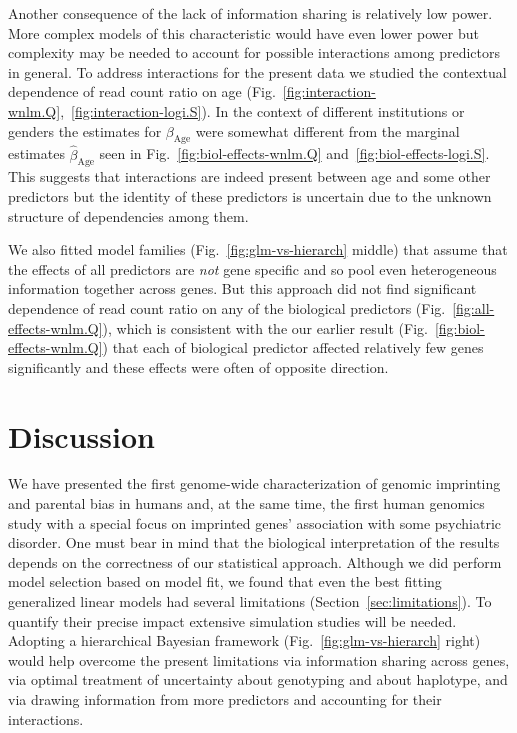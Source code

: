 \documentclass[letterpaper]{article}
\begin{document}
Another consequence of the lack of information sharing is relatively low
power.  More complex models of this characteristic would have even lower power
but complexity may be needed to account for possible interactions among predictors in
general.  To address interactions for the present data we studied the contextual
dependence of read count ratio on age
(Fig.~\ref{fig:interaction-wnlm.Q},~\ref{fig:interaction-logi.S}).  In the
context of different institutions or genders the estimates for
\(\beta_\mathrm{Age}\) were somewhat different from the marginal estimates
\(\hat\beta_\mathrm{Age}\) seen in Fig.~\ref{fig:biol-effects-wnlm.Q}
and~\ref{fig:biol-effects-logi.S}.  This suggests that interactions are indeed
present between age and some other predictors but the identity of these
predictors is uncertain due to the unknown structure of dependencies among them.

We also fitted model families (Fig.~\ref{fig:glm-vs-hierarch} middle) that
assume that the effects of all predictors are \emph{not} gene specific and so
pool even heterogeneous information together across genes.  But this approach
did not find significant dependence of read count ratio on any of the
biological predictors (Fig.~\ref{fig:all-effects-wnlm.Q}), which is consistent
with the our earlier result (Fig.~\ref{fig:biol-effects-wnlm.Q}) that each of
biological predictor affected relatively few genes significantly and these
effects were often of opposite direction.

\section{Discussion}

We have presented the first genome-wide characterization of genomic imprinting
and parental bias in humans and, at the same time, the first human genomics
study with a special focus on imprinted genes' association with some
psychiatric disorder.  One must bear in mind that the biological
interpretation of the results depends on the correctness of our statistical
approach.  Although we did perform model selection based on model fit, we
found that even the best fitting generalized linear models had several
limitations (Section~\ref{sec:limitations}).  To quantify their precise impact
extensive simulation studies will be needed.  Adopting a hierarchical Bayesian
framework (Fig.~\ref{fig:glm-vs-hierarch} right) would help overcome the
present limitations via information sharing across genes, via optimal
treatment of uncertainty about genotyping and about haplotype, and via drawing
information from more predictors and accounting for their interactions.  
\end{document}
